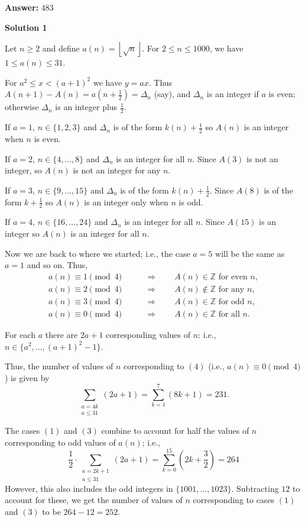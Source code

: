 \begin{enumerate}
 



 
 \textbf{Answer: }483



\textbf{Solution 1}

Let $n\ge 2$ and define $a(n) = \left\lfloor \sqrt n \right\rfloor$. For $2\le n \le 1000$, we have $1\le a(n)\le 31$. 

 For $a^2 \le x < (a+1)^2$ we have $y=ax$. Thus $A(n+1)-A(n)=a(n+\frac 12) = \Delta_n$ (say), and $\Delta_n$ is an integer if $a$ is even; otherwise $\Delta_n$ is an integer plus $\frac 12$.

 If $a=1$, $n\in \{1,2,3\}$ and $\Delta_n$ is of the form $k(n)+\frac 12$ so $A(n)$ is an integer when $n$ is even. 

 If $a=2$, $n\in\{4,\ldots , 8\}$ and $\Delta_n$ is an integer for all $n$. Since $A(3)$ is not an integer, so $A(n)$ is not an integer for any $n$. 

 If $a=3$, $n\in\{9,\ldots , 15\}$ and $\Delta_n$ is of the form $k(n)+\frac 12$. Since $A(8)$ is of the form $k+\frac 12$ so $A(n)$ is an integer only when $n$ is odd.

 If $a=4$, $n\in\{16,\ldots , 24\}$ and $\Delta_n$ is an integer for all $n$. Since $A(15)$ is an integer so $A(n)$ is an integer for all $n$. 

 Now we are back to where we started; i.e., the case $a=5$ will be the same as $a=1$ and so on. Thus, 
 \begin{align} a(n)\equiv 1\pmod 4 \qquad &\Longrightarrow \qquad A(n) \in \mathbb{Z} \textrm{ for even } n, \\ a(n)\equiv 2\pmod 4 \qquad &\Longrightarrow \qquad A(n) \not\in \mathbb{Z} \textrm{  for any } n, \\ a(n)\equiv 3\pmod 4 \qquad &\Longrightarrow \qquad A(n) \in \mathbb{Z} \textrm{ for odd  } n, \\ a(n)\equiv 0\pmod 4 \qquad &\Longrightarrow \qquad A(n) \in \mathbb{Z} \textrm{ for all } n. \end{align}

 For each $a$ there are $2a+1$ corresponding values of $n$: i.e., $n\in \{a^2, \ldots , (a+1)^2-1\}$.

 Thus, the number of values of $n$ corresponding to $(4)$ (i.e., $a(n)\equiv 0\pmod 4$) is given by 
 \[\sum_{\substack{a=4k \\ a\le 31}}(2a+1) = \sum_{k=1}^7 (8k+1)=231.\]

 The cases $(1)$ and $(3)$ combine to account for half the values of $n$ corresponding to odd values of $a(n)$; i.e.,
 \[\frac 12 \cdot \sum_{\substack{a=2k+1 \\ a\le 31}} (2a+1) = \sum_{k=0}^{15} (2k+\frac 32) = 264\]However, this also includes the odd integers in $\{1001, \ldots , 1023\}$. Subtracting $12$ to account for these, we get the  number of values of $n$ corresponding to cases $(1)$ and $(3)$ to be $264-12=252$.


\end{enumerate}
